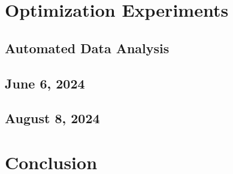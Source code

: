 \section{Optimization Experiments}

\subsection{Automated Data Analysis}

\subsection{June 6, 2024}

\subsection{August 8, 2024}

\section{Conclusion}